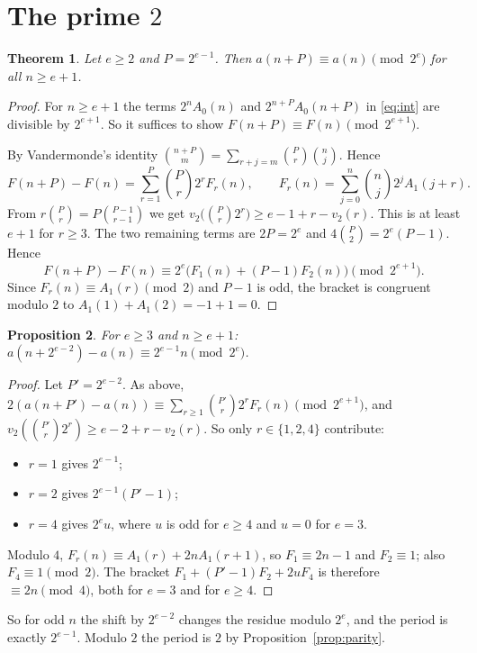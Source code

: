 \documentclass[11pt]{amsart}
\newtheorem{theorem}{Theorem}
\newtheorem{proposition}[theorem]{Proposition}
\theoremstyle{remark}
\begin{document}
\section{The prime $2$}

\begin{theorem}\label{thm:two}
Let $e\ge2$ and $P=2^{e-1}$.
Then $a(n+P)\equiv a(n)\pmod{2^e}$ for all $n\ge e+1$.
\end{theorem}

\begin{proof}
For $n\ge e+1$ the terms $2^nA_0(n)$ and $2^{n+P}A_0(n+P)$ in \eqref{eq:int} are divisible by $2^{e+1}$.
So it suffices to show $F(n+P)\equiv F(n)\pmod{2^{e+1}}$.

By Vandermonde's identity $\binom{n+P}m=\sum_{r+j=m}\binom Pr\binom nj$.
Hence
\[
F(n+P)-F(n)=\sum_{r=1}^{P}\binom Pr2^rF_r(n),\qquad F_r(n)=\sum_{j=0}^n\binom nj2^jA_1(j+r).
\]
From $r\binom Pr=P\binom{P-1}{r-1}$ we get $v_2\bigl(\binom Pr2^r\bigr)\ge e-1+r-v_2(r)$.
This is at least $e+1$ for $r\ge3$.
The two remaining terms are $2P=2^e$ and $4\binom P2=2^e(P-1)$.
Hence
\[
F(n+P)-F(n)\equiv2^e\bigl(F_1(n)+(P-1)F_2(n)\bigr)\pmod{2^{e+1}}.
\]
Since $F_r(n)\equiv A_1(r)\pmod 2$ and $P-1$ is odd, the bracket is congruent modulo $2$ to $A_1(1)+A_1(2)=-1+1=0$.
\end{proof}

\begin{proposition}\label{prop:exact}
For $e\ge3$ and $n\ge e+1$: $a(n+2^{e-2})-a(n)\equiv2^{e-1}n\pmod{2^e}$.
\end{proposition}

\begin{proof}
Let $P'=2^{e-2}$.
As above, $2(a(n+P')-a(n))\equiv\sum_{r\ge1}\binom{P'}r2^rF_r(n)\pmod{2^{e+1}}$, and $v_2(\binom{P'}r2^r)\ge e-2+r-v_2(r)$.
So only $r\in\{1,2,4\}$ contribute:
\begin{itemize}
\item $r=1$ gives $2^{e-1}$;
\item $r=2$ gives $2^{e-1}(P'-1)$;
\item $r=4$ gives $2^e u$, where $u$ is odd for $e\ge4$ and $u=0$ for $e=3$.
\end{itemize}
Modulo $4$, $F_r(n)\equiv A_1(r)+2nA_1(r+1)$, so $F_1\equiv2n-1$ and $F_2\equiv1$; also $F_4\equiv1\pmod2$.
The bracket $F_1+(P'-1)F_2+2uF_4$ is therefore $\equiv2n\pmod4$, both for $e=3$ and for $e\ge4$.
\end{proof}

So for odd $n$ the shift by $2^{e-2}$ changes the residue modulo $2^e$, and the period is exactly $2^{e-1}$.
Modulo $2$ the period is $2$ by Proposition~\ref{prop:parity}.
\end{document}
